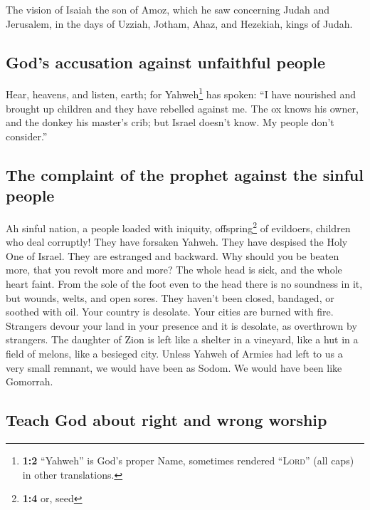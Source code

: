 \begin{paracol}{2}
\begin{otherlanguage}{english}
 The vision of Isaiah the son of Amoz, which he saw
concerning Judah and Jerusalem, in the days of Uzziah, Jotham, Ahaz, and
Hezekiah, kings of Judah.

\hypertarget{gods-accusation-against-unfaithful-people}{%
\subsection{God's accusation against unfaithful
people}\label{gods-accusation-against-unfaithful-people}}

 Hear, heavens, and listen, earth; for Yahweh\footnote{\textbf{1:2}
  ``Yahweh'' is God's proper Name, sometimes rendered ``\textsc{Lord}''
  (all caps) in other translations.} has spoken: ``I have nourished and
brought up children and they have rebelled against me. 
The ox knows his owner, and the donkey his master's crib; but Israel
doesn't know. My people don't consider.''

\hypertarget{the-complaint-of-the-prophet-against-the-sinful-people}{%
\subsection{The complaint of the prophet against the sinful
people}\label{the-complaint-of-the-prophet-against-the-sinful-people}}

 Ah sinful nation, a people loaded with iniquity,
offspring\footnote{\textbf{1:4} or, seed} of evildoers, children who
deal corruptly! They have forsaken Yahweh. They have despised the Holy
One of Israel. They are estranged and backward.  Why
should you be beaten more, that you revolt more and more? The whole head
is sick, and the whole heart faint.  From the sole of the
foot even to the head there is no soundness in it, but wounds, welts,
and open sores. They haven't been closed, bandaged, or soothed with oil.
 Your country is desolate. Your cities are burned with
fire. Strangers devour your land in your presence and it is desolate, as
overthrown by strangers.  The daughter of Zion is left
like a shelter in a vineyard, like a hut in a field of melons, like a
besieged city.  Unless Yahweh of Armies had left to us a
very small remnant, we would have been as Sodom. We would have been like
Gomorrah.

\hypertarget{teach-god-about-right-and-wrong-worship}{%
\subsection{Teach God about right and wrong
worship}\label{teach-god-about-right-and-wrong-worship}}


\end{otherlanguage}
\end{paracol}

